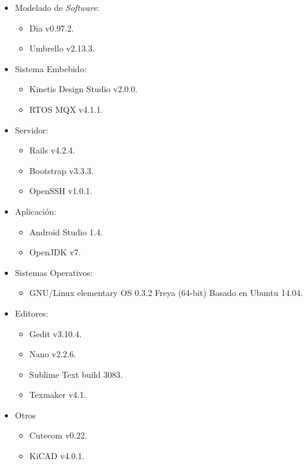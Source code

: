 \begin{itemize}
\item Modelado de \textit{Software}:
	\begin{itemize}
	\item Dia v0.97.2.
	\item Umbrello v2.13.3.
	\end{itemize}
\item Sistema Embebido:
	\begin{itemize}
	\item Kinetis Design Studio v2.0.0.
	\item RTOS MQX v4.1.1.
	\end{itemize}
\item Servidor:
	\begin{itemize}
	\item Rails v4.2.4.
	\item Bootstrap v3.3.3.
	\item OpenSSH v1.0.1.
	\end{itemize}
\item Aplicación:
	\begin{itemize}
	\item Android Studio 1.4.
	\item OpenJDK  v7.
	\end{itemize}
\item Sistemas Operativos:
\begin{itemize}
	\item GNU/Linux elementary OS 0.3.2 Freya (64-bit) Basado en Ubuntu 14.04.
	\end{itemize}	
\item Editores:
	\begin{itemize}
	\item Gedit v3.10.4.
	\item Nano v2.2.6.
	\item Sublime Text build 3083.
	\item Texmaker v4.1.
	\end{itemize}
\item Otros
	\begin{itemize}
	\item Cutecom v0.22.
	\item KiCAD v4.0.1.
	\end{itemize}
\end{itemize}


